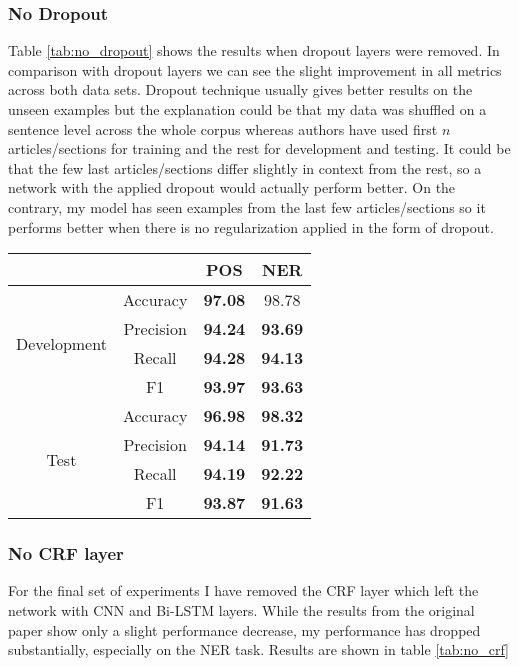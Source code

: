 \label{peculiar_dropout}
\subsubsection{No Dropout}
Table \ref{tab:no_dropout} shows the results when dropout layers were removed.
In comparison with dropout layers we can see the slight improvement in all
metrics across both data sets. Dropout technique usually gives better results
on the unseen examples but the explanation could be that my data was shuffled
on a sentence level across the whole corpus whereas authors have used first $n$
articles/sections for training and the rest for development and testing. It
could be that the few last articles/sections differ slightly in context from
the rest, so a network with the applied dropout would actually perform better.
On the contrary, my model has seen examples from the last few articles/sections so it
performs better when there is no regularization applied in the form of dropout.

\begin{center}
\begin{tabular}{ |c|c|c|c| }
\hline
& & {\textbf{POS}} & {\textbf{NER}}\\ \hline
\multirow{4}{*}{Development} & Accuracy & \textbf{97.08} & 98.78 \\
 & Precision & \textbf{94.24} & \textbf{93.69} \\
 & Recall & \textbf{94.28} & \textbf{94.13} \\
 & F1 & \textbf{93.97} & \textbf{93.63} \\ \hline
\multirow{4}{*}{Test} & Accuracy & \textbf{96.98} & \textbf{98.32} \\
 & Precision & \textbf{94.14} & \textbf{91.73} \\
 & Recall & \textbf{94.19} & \textbf{92.22} \\
 & F1 & \textbf{93.87} & \textbf{91.63} \\ \hline
\end{tabular}
\label{tab:no_dropout}
\end{center}

\subsubsection{No CRF layer}
For the final set of experiments I have removed the CRF layer which left the
network with CNN and Bi-LSTM layers. While the results from the original paper
show only a slight performance decrease, my performance has dropped
substantially, especially on the NER task. Results are shown in table
\ref{tab:no_crf}

